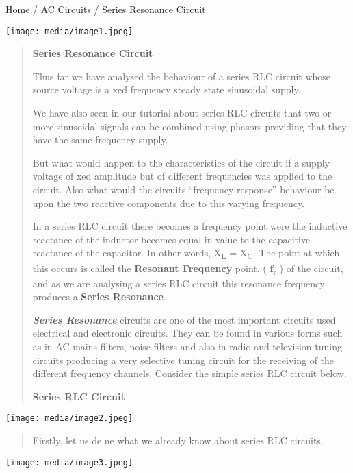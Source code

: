 \documentclass[]{article}
\date{}
\begin{document}
\href{https://www.electronics-tutorials.ws/}{Home} /
\href{https://www.electronics-tutorials.ws/category/accircuits}{AC
Circuits} / Series Resonance Circuit

\texttt{[image: media/image1.jpeg]}

\begin{quote}
\textbf{Series Resonance Circuit}

Thus far we have analysed the behaviour of a series RLC circuit whose
source voltage is a xed frequency steady state sinusoidal supply.

We have also seen in our tutorial about series RLC circuits that two or
more sinusoidal signals can be combined using phasors providing that
they have the same frequency supply.

But what would happen to the characteristics of the circuit if a supply
voltage of xed amplitude but of different frequencies was applied to the
circuit. Also what would the circuits ``frequency response'' behaviour
be upon the two reactive components due to this varying frequency.

In a series RLC circuit there becomes a frequency point were the
inductive reactance of the inductor becomes equal in value to the
capacitive reactance of the capacitor. In other words,
X\textsubscript{L} = X\textsubscript{C}. The point at which this occurs
is called the \textbf{Resonant Frequency} point, (
\textbf{f}\textsubscript{r} ) of the circuit, and as we are analysing a
series RLC circuit this resonance frequency produces a \textbf{Series
Resonance}.

\emph{\textbf{Series Resonance}} circuits are one of the most important
circuits used electrical and electronic circuits. They can be found in
various forms such as in AC mains filters, noise filters and also in radio
and television tuning circuits producing a very selective tuning circuit
for the receiving of the different frequency channels. Consider the
simple series RLC circuit below.

\textbf{Series RLC Circuit}
\end{quote}

\texttt{[image: media/image2.jpeg]}

\begin{quote}
Firstly, let us de ne what we already know about series RLC circuits.
\end{quote}

\texttt{[image: media/image3.jpeg]}
\end{document}
